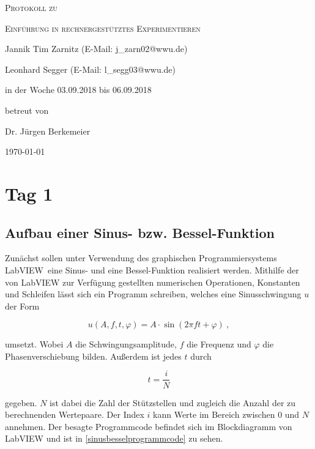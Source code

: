 \documentclass[
a4paper,
12pt,
pagesize,
ngerman
]{scrartcl}
\begin{document}
	
	\begin{titlepage}
		\centering
		{\scshape\LARGE Protokoll zu \par}
		\vspace{1cm}
		{\scshape\huge Einführung in rechnergestütztes Experimentieren \par}
		\vspace{3cm}
		
		{\large Jannik Tim Zarnitz (E-Mail: j\_zarn02@wwu.de) \par}
		{\large Leonhard Segger (E-Mail: l\_segg03@wwu.de) \par}
		\vfill
		
		in der Woche 03.09.2018 bis 06.09.2018\par
		betreut von\par
		{\large Dr. Jürgen Berkemeier}
		
		\vfill
		
		{\large \today\par}
	\end{titlepage}
	\tableofcontents
	\newpage

	\section{Tag 1}
	
	\subsection{Aufbau einer Sinus- bzw. Bessel-Funktion} \label{sinusfkt}
	
	Zunächst sollen unter Verwendung des graphischen Programmiersystems \glqq LabVIEW\grqq\ eine Sinus- und eine Bessel-Funktion realisiert werden. Mithilfe der von LabVIEW zur Verfügung gestellten numerischen Operationen, Konstanten und Schleifen lässt sich ein Programm schreiben, welches eine Sinusschwingung $u$ der Form
	
	\begin{equation} \label{u}
	u(A,f,t,\varphi) = A \cdot \sin(2\pi f t + \varphi) \ ,
	\end{equation}
	
	\noindent umsetzt. Wobei $A$ die Schwingungsamplitude, $f$ die Frequenz und $\varphi$ die Phasenverschiebung bilden. Außerdem ist jedes $t$ durch 
	
	\begin{equation} \label{t}
	t = \frac{i}{N}
	\end{equation}
	
	\noindent gegeben. $N$ ist dabei die Zahl der Stützstellen und zugleich die Anzahl der zu berechnenden Wertepaare. Der Index $i$ kann Werte im Bereich zwischen $0$ und $N$ annehmen. Der besagte Programmcode befindet sich im Blockdiagramm von LabVIEW und ist in \cref{sinusbesselprogrammcode} zu sehen. 
	
\end{document}
